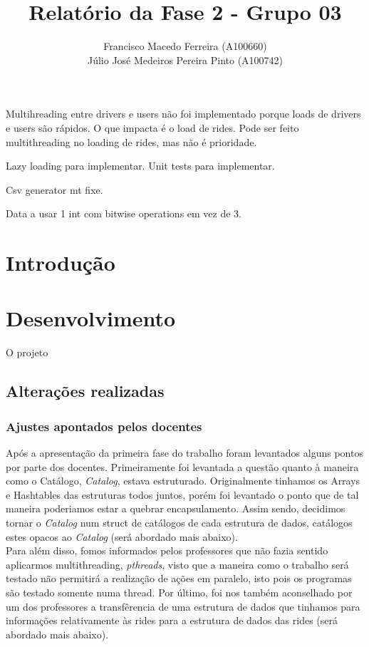 \documentclass{article}
\title{Relatório da Fase 2 - Grupo 03}
\author{Francisco Macedo Ferreira (A100660)\\Júlio José Medeiros Pereira Pinto (A100742)}
\begin{document}
  
    \maketitle
    Multihreading entre drivers e users não foi implementado porque loads de drivers e users são rápidos.
    O que impacta é o load de rides.
    Pode ser feito multithreading no loading de rides, mas não é prioridade.

    Lazy loading para implementar.
    Unit tests para implementar.

    Csv generator mt fixe.

    Data a usar 1 int com bitwise operations em vez de 3.

    \section{Introdução}
    \lipsum[1]
    
    \section{Desenvolvimento}
    O projeto 
    \subsection{Alterações realizadas}
        \subsubsection{Ajustes apontados pelos docentes}
            Após a apresentação da primeira fase do trabalho 
            foram levantados alguns pontos por parte dos docentes. 
            Primeiramente foi levantada a questão quanto à maneira como 
            o Catálogo, \emph{Catalog}, estava estruturado. 
            Originalmente tinhamos os Arrays e Hashtables das estruturas
            todos juntos, porém foi levantado o ponto que de tal maneira 
            poderiamos estar a quebrar encapsulamento. Assim sendo, 
            decidimos tornar o \emph{Catalog} num struct de catálogos de 
            cada estrutura de dados, catálogos estes opacos ao \emph{Catalog} 
            (será abordado mais abaixo).\\Para além disso, fomos informados 
            pelos professores que não fazia sentido aplicarmos multithreading, 
            \emph{pthreads}, visto que a maneira como o trabalho será testado 
            não permitirá a realização de ações em paralelo, isto pois os 
            programas são testado somente numa thread. Por último, foi nos 
            também aconselhado por um dos professores a transfêrencia
            de uma estrutura de dados que tinhamos para informações 
            relativamente às rides para a estrutura de dados das rides 
            (será abordado mais abaixo).
\end{document}

